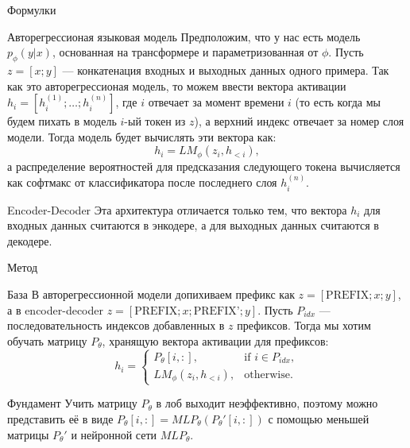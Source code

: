 \documentclass[9pt]{beamer}
\begin{document}
\begin{frame}{Формулки}

    \begin{block}{Авторегрессионая языковая модель}
        Предположим, что у нас есть модель $p_{\phi}(y | x)$, основанная на трансформере и параметризованная от $\phi$. Пусть $z = [x; y]$ --- конкатенация входных и выходных данных одного примера. Так как это авторегрессионая модель, то можем ввести вектора активации $h_i = [h_i^{(1)}; \ldots ; h_i^{(n)}]$, где $i$ отвечает за момент времени $i$ (то есть когда мы будем пихать в модель $i$-ый токен из $z$), а верхний индекс отвечает за номер слоя модели. Тогда модель будет вычислять эти вектора как: \[ h_i = LM_{\phi}(z_i, h_{<i}), \] а распределение вероятностей для предсказания следующего токена вычисляется как софтмакс от классификатора после последнего слоя $h_i^{(n)}$.
    \end{block}

    \begin{block}{Encoder-Decoder}
        Эта архитектура отличается только тем, что вектора $h_i$ для входных данных считаются в энкодере, а для выходных данных считаются в декодере.
    \end{block}

\end{frame}


\begin{frame}{Метод}
    
    \begin{block}{База}
        В авторегрессионной модели допихиваем префикс как $z = [\text{PREFIX}; x; y]$, а в encoder-decoder $z = [\text{PREFIX}; x; \text{PREFIX'}; y]$. Пусть $P_{idx}$ --- последовательность индексов добавленных в $z$ префиксов. Тогда мы хотим обучать матрицу $P_{\theta}$, хранящую вектора активации для префиксов: \[ h_i = \begin{cases}
            P_{\theta}[i, :], & \text{if } i \in P_{idx}, \\
            LM_{\phi}(z_i, h_{<i}), & \text{otherwise}.
        \end{cases} \]
    \end{block}

    \begin{block}{Фундамент}
        Учить матрицу $P_{\theta}$ в лоб выходит неэффективно, поэтому можно представить её в виде $P_{\theta}[i, :] = MLP_{\theta}(P_{\theta}'[i, :])$ с помощью меньшей матрицы $P_{\theta}'$ и нейронной сети $MLP_{\theta}$.
    \end{block}

\end{frame}
\end{document}
